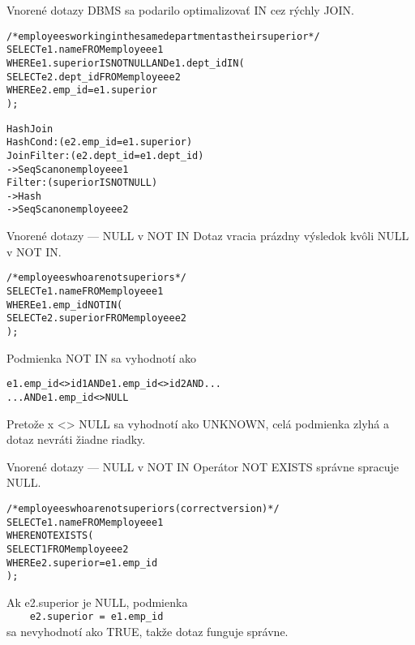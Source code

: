 \documentclass[12pt]{beamer}
\begin{document}
\begin{frame}[fragile]{Vnorené dotazy}
DBMS sa \alert{podarilo} optimalizovať IN cez rýchly JOIN.
\medskip

\begin{scriptsize}
\begin{alltt}
/* employees working in the same department as their superior */
SELECT e1.name FROM employee e1
WHERE e1.superior IS NOT NULL AND e1.dept_id IN (
    SELECT e2.dept_id FROM employee e2
    WHERE e2.emp_id = e1.superior
);
\end{alltt}
\end{scriptsize}
\smallskip
\begin{small}
\begin{alltt}
\alert{Hash Join}
  Hash Cond: (e2.emp_id = e1.superior)
  Join Filter: (e2.dept_id = e1.dept_id)
  ->  Seq Scan on employee e1
        Filter: (superior IS NOT NULL)
  ->  Hash
        ->  Seq Scan on employee e2
\end{alltt}
\end{small}
\end{frame}

\begin{frame}[fragile]{Vnorené dotazy --- NULL v NOT IN}
Dotaz vracia \alert{prázdny} výsledok kvôli NULL v NOT IN.
\medskip

\begin{scriptsize}
\begin{alltt}
/* employees who are not superiors */
SELECT e1.name FROM employee e1
WHERE e1.emp_id NOT IN (
    SELECT e2.superior FROM employee e2
);
\end{alltt}
\end{scriptsize}
\smallskip
Podmienka NOT IN sa vyhodnotí ako
\begin{small}
\begin{alltt}
e1.emp_id <> id1 AND e1.emp_id <> id2 AND ...
  ... AND \alert{e1.emp_id <> NULL}
\end{alltt}
\end{small}
\smallskip
Pretože x <> NULL sa vyhodnotí ako UNKNOWN, celá podmienka
zlyhá a dotaz nevráti žiadne riadky.
\end{frame}

\begin{frame}[fragile]{Vnorené dotazy --- NULL v NOT IN}
Operátor NOT EXISTS \alert{správne spracuje NULL}.
\medskip

\begin{scriptsize}
\begin{alltt}
/* employees who are not superiors (correct version) */
SELECT e1.name FROM employee e1
WHERE NOT EXISTS (
    SELECT 1 FROM employee e2
    WHERE e2.superior = e1.emp_id
);
\end{alltt}
\end{scriptsize}
\smallskip
Ak e2.superior je NULL, podmienka\\
\verb|    e2.superior = e1.emp_id|\\
sa nevyhodnotí ako TRUE, takže dotaz funguje správne.
\end{frame}
\end{document}
